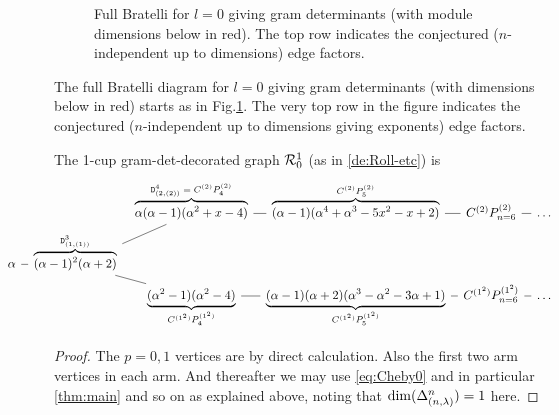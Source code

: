 \begin{figure}

    \caption{Full Bratelli for $l=0$ giving gram determinants (with module dimensions below in red). 
    The top row indicates the conjectured ($n$-independent up to dimensions) edge factors. }
    \label{fig:Bratelli-l0-gramdets}
\end{figure}




\mdef 
The full Bratelli diagram for $l=0$ giving gram determinants (with dimensions below in red) 
starts as in Fig.\ref{fig:Bratelli-l0-gramdets}. 
    The very top row in the figure indicates the conjectured ($n$-independent up to dimensions giving exponents) edge factors. 

\begin{proposition}\label{pr:1cupgram}
The 1-cup gram-det-decorated graph ${\mathcal{R}}^1_0$ (as in \ref{de:Roll-etc}) is   %
\[  \hspace{-1.5cm} 
\begin{tikzcd}[row sep=tiny,column sep=tiny]
&&  \overbrace{\alpha (\alpha-1)(\alpha^2 +x-4)}^{\Delttt{4}{2,(2)} \;=\; C^{(2)}P^{(2)}_4} \ar[r,dash] &
  \overbrace{(\alpha-1)(\alpha^4 +\alpha^3 -5x^2 -x+2)}^{C^{(2)}P^{(2)}_{5}} \ar[r,dash] &
  C^{(2)}P^{(2)}_{n=6} \ar[r,dash] & \dots
  \\
    \alpha \ar[r,dash] &
    \overbrace{
    (\alpha-1)^2 (\alpha+2)   }^{\Delttt{3}{1,(1)}  }   \ar[ur,dash]\ar[dr,dash]
    \\
    &&\underbrace{(\alpha^2 -1)(\alpha^2 -4)}_{C^{(1^2)}P^{(1^2)}_4} \ar[r,dash] &
    \underbrace{(\alpha-1)(\alpha+2)(\alpha^3 -\alpha^2 -3\alpha+1)}_{C^{(1^2)}P^{(1^2)}_5} \ar[r,dash] &
    C^{(1^2)}P^{(1^2)}_{n=6} \ar[r,dash] & \dots
\end{tikzcd}
\]
\end{proposition}
\begin{proof}
    The $p=0,1$ vertices are by direct calculation. Also the first two arm vertices in each arm. And thereafter we may use 
\ref{eq:Cheby0} and in particular \ref{thm:main} and so on as explained above, 
noting that $\dim(\Delta^{n}_{(n,\lambda)}) = 1$ here. 
\end{proof}


